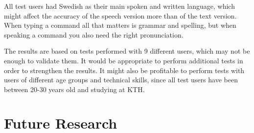 All test users had Swedish as their main spoken and written language, which might affect the accuracy of the speech version more than of the text version. When typing a command all that matters is grammar and spelling, but when speaking a command you also need the right pronunciation.

The results are based on tests performed with 9 different users, which may not be enough to validate them. It would be appropriate to perform additional tests in order to strengthen the results. It might also be profitable to perform tests with users of different age groups and technical skills, since all test users have been between 20-30 years old and studying at KTH.

\section{Future Research}